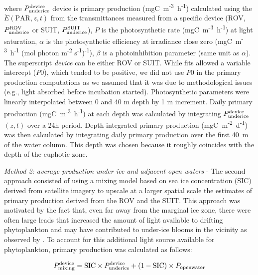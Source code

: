 \documentclass[draft]{agujournal2018}
\newcommand{\ppundericedevice}{\ensuremath{P_{\textnormal{\scriptsize underice}}^{\textnormal{\scriptsize device}}}}
\newcommand{\ppmixingdevice}{\ensuremath{P_{\textnormal{\scriptsize mixing}}^{\textnormal{\scriptsize device}}}}
\newcommand{\ppsuitunderice}{\ensuremath{P_{\textnormal{\scriptsize underice}}^{\textnormal{\scriptsize SUIT}}}}
\newcommand{\pprovunderice}{\ensuremath{P_{\textnormal{\scriptsize underice}}^{\textnormal{\scriptsize ROV}}}}
\newcommand{\ppopenwater}{\ensuremath{P_{\textnormal{\scriptsize openwater}}}}
\newcommand{\dailypp}{mgC~m\textsuperscript{-2}~d\textsuperscript{-1}}
\begin{document}
\noindent where \ppundericedevice{} device is primary production (mgC~m\textsuperscript{-3}~h\textsuperscript{-1}) calculated using the $\mathring{E}(\text{PAR}, z, t)$ from the transmittances measured from a specific device (ROV, \pprovunderice{} or SUIT, \ppsuitunderice{}), $P$ is the photosynthetic rate (mgC~m\textsuperscript{-3}~h\textsuperscript{-1}) at light saturation, $\alpha$ is the photosynthetic efficiency at irradiance close zero (mgC~m\textsuperscript{-3}~h\textsuperscript{-1} (\textmu mol photon m\textsuperscript{-2} s\textsuperscript{-1})\textsuperscript{-1}), $\beta$ is a photoinhibition parameter (same unit as $\alpha$). The superscript \textit{device} can be either ROV or SUIT. While fits allowed a variable intercept ($P0$), which tended to be positive, we did not use $P0$ in the primary production computations as we assumed that it was due to methodological issues (e.g., light absorbed before incubation started). Photosynthetic parameters were linearly interpolated between 0 and 40 m depth by 1 m increment. Daily primary production (mgC~m\textsuperscript{-3}~h\textsuperscript{-1}) at each depth was calculated by integrating \ppundericedevice{}$(z,t)$ over a 24h period. Depth-integrated primary production (\dailypp{}) was then calculated by integrating daily primary production over the first 40~m of the water column. This depth was chosen because it roughly coincides with the depth of the euphotic zone.

\textit{Method 2: average production under ice and adjacent open waters} - The second approach consisted of using a mixing model based on sea ice concentration (SIC) derived from satellite imagery to upscale at a larger spatial scale the estimates of primary production derived from the ROV and the SUIT. This approach was motivated by the fact that, even far away from the marginal ice zone, there were often large leads that increased the amount of light available to drifting phytoplankton and may have contributed to under-ice blooms in the vicinity as observed by \citet{Assmy2017}. To account for this additional light source available for phytoplankton, primary production was calculated as follows:

\begin{linenomath*}
    \begin{equation}
		\ppmixingdevice{} = \text{SIC} \times \ppundericedevice{} + (1 - \text{SIC}) \times \ppopenwater{}
	\end{equation}
\end{linenomath*}
\end{document}
